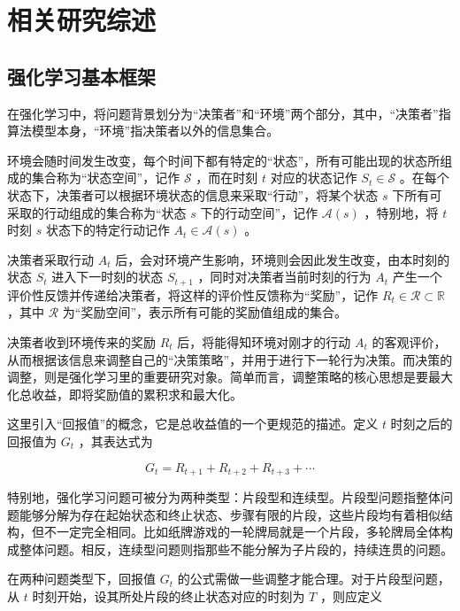 

\chapter{相关研究综述}
\label{chpt:relatedwork}

\section{强化学习基本框架}

在强化学习中，将问题背景划分为“决策者”和“环境”两个部分，其中，“决策者”指算法模型本身，“环境”指决策者以外的信息集合。

环境会随时间发生改变，每个时间下都有特定的“状态”，所有可能出现的状态所组成的集合称为“状态空间”，记作 $\mathcal S$ ，而在时刻 $t$ 对应的状态记作 $S_t\in \mathcal S$ 。在每个状态下，决策者可以根据环境状态的信息来采取“行动”，将某个状态 $s$ 下所有可采取的行动组成的集合称为“状态 $s$ 下的行动空间”，记作 $\mathcal{A}(s)$ ，特别地，将 $t$ 时刻 $s$ 状态下的特定行动记作 $A_t\in\mathcal{A}(s)$ 。

决策者采取行动 $A_t$ 后，会对环境产生影响，环境则会因此发生改变，由本时刻的状态 $S_t$ 进入下一时刻的状态 $S_{t+1}$ ，同时对决策者当前时刻的行为 $A_t$ 产生一个评价性反馈并传递给决策者，将这样的评价性反馈称为“奖励”，记作 $R_{t}\in\mathcal{R}\subset\mathbb{R}$ ，其中 $\mathcal{R}$ 为“奖励空间”，表示所有可能的奖励值组成的集合。

决策者收到环境传来的奖励 $R_{t}$ 后，将能得知环境对刚才的行动 $A_t$ 的客观评价，从而根据该信息来调整自己的“决策策略”，并用于进行下一轮行为决策。而决策的调整，则是强化学习里的重要研究对象。简单而言，调整策略的核心思想是要最大化总收益，即将奖励值的累积求和最大化。

这里引入“回报值”的概念，它是总收益值的一个更规范的描述。定义 $t$ 时刻之后的回报值为 $G_t$ ，其表达式为

\begin{equation}
G_t = R_{t+1}+R_{t+2}+R_{t+3}+\cdots
\end{equation}

特别地，强化学习问题可被分为两种类型：片段型和连续型。片段型问题指整体问题能够分解为存在起始状态和终止状态、步骤有限的片段，这些片段均有着相似结构，但不一定完全相同。比如纸牌游戏的一轮牌局就是一个片段，多轮牌局全体构成整体问题。相反，连续型问题则指那些不能分解为子片段的，持续连贯的问题。

在两种问题类型下，回报值 $G_t$ 的公式需做一些调整才能合理。对于片段型问题，从 $t$ 时刻开始，设其所处片段的终止状态对应的时刻为 $T$ ，则应定义


